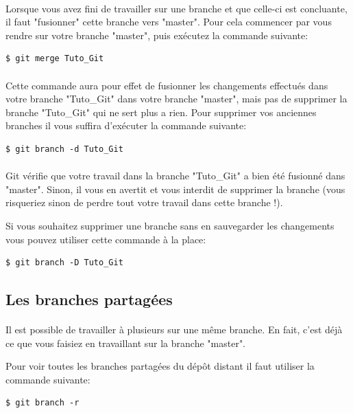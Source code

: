 \documentclass[french, a4paper, 12pt, titlepage]{article}
\begin{document}
\paragraph{}Lorsque vous avez fini de travailler sur une branche et que celle-ci est concluante, il faut "fusionner" cette branche vers "master". Pour cela commencer par vous rendre sur votre branche "master", puis exécutez la commande suivante:
\begin{lstlisting}
$ git merge Tuto_Git
\end{lstlisting}

\paragraph{}Cette commande aura pour effet de fusionner les changements effectués dans votre branche "Tuto\_Git" dans votre branche "master", mais pas de supprimer la branche "Tuto\_Git" qui ne sert plus a rien. Pour supprimer vos anciennes branches il vous suffira d'exécuter la commande suivante:
\begin{lstlisting}
$ git branch -d Tuto_Git
\end{lstlisting}

\paragraph{}Git vérifie que votre travail dans la branche "Tuto\_Git" a bien été fusionné dans "master". Sinon, il vous en avertit et vous interdit de supprimer la branche (vous risqueriez sinon de perdre tout votre travail dans cette branche !).

Si vous souhaitez supprimer une branche sans en sauvegarder les changements vous pouvez utiliser cette commande à la place:
\begin{lstlisting}
$ git branch -D Tuto_Git
\end{lstlisting}

\subsection{Les branches partagées}
\paragraph{}Il est possible de travailler à plusieurs sur une même branche. En fait, c’est déjà ce que vous faisiez en travaillant sur la branche "master".

Pour voir toutes les branches partagées du dépôt distant il faut utiliser la commande suivante:
\begin{lstlisting}
$ git branch -r
\end{lstlisting}
\end{document}
